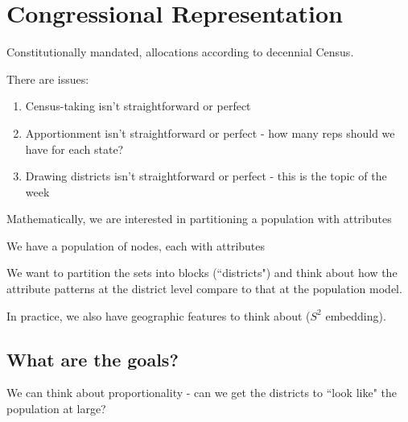 






\section*{Congressional Representation}
Constitutionally mandated, allocations according to decennial Census.


There are issues:

\begin{enumerate}
\item[] Census-taking isn't straightforward or perfect
\item[] Apportionment isn't straightforward or perfect - how many reps should we have for each state?
\item[] Drawing districts isn't straightforward or perfect - this is the topic of the week

\end{enumerate}









Mathematically, we are interested in partitioning a population with attributes

We have a population of nodes, each with attributes

We want to partition the sets into blocks (``districts") and think about how the attribute patterns at the district level compare to that at the population model.

In practice, we also have geographic features to think about ($S^2$ embedding).

\subsection*{What are the goals?}

We can think about proportionality - can we get the districts to ``look like" the population at large?

